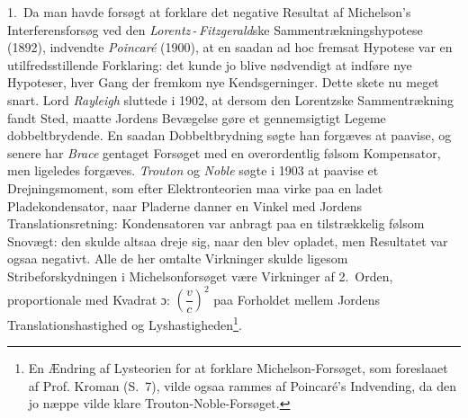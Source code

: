 \documentclass[12pt,a4paper]{article}
\begin{document}
1.\ Da man havde forsøgt at forklare det negative Resultat af
Michelson's Interferensforsøg ved den \emph{Lorentz\,-\,Fitzgerald}ske
Sammentrækningshypotese (1892), indvendte \emph{Poincaré} (1900),
at en saadan ad hoc fremsat Hypotese var en utilfredsstillende
Forklaring: det kunde jo blive nødvendigt at indføre nye Hypoteser,
hver Gang der fremkom nye Kendsgerninger. Dette skete nu meget snart.
Lord \emph{Rayleigh} sluttede i 1902, at dersom den Lorentzske
Sammentrækning fandt Sted, maatte Jordens Bevægelse gøre et
gennemsigtigt Legeme dobbeltbrydende. En saadan Dobbeltbrydning søgte
han forgæves at paavise, og senere har \emph{Brace} gentaget Forsøget
med en overordentlig følsom Kompensator, men ligeledes forgæves.
\emph{Trouton} og \emph{Noble} søgte i 1903 at paavise et
Drejningsmoment, som efter Elektronteorien maa virke paa en ladet
Pladekondensator, naar Pladerne danner en Vinkel med Jordens
Translationsretning: Kondensatoren var anbragt paa en tilstrækkelig
følsom Snovægt: den skulde altsaa dreje sig, naar den blev opladet, men
Resultatet var ogsaa negativt. Alle de her omtalte Virkninger skulde
ligesom Stribeforskydningen i Michelsonforsøget være Virkninger af
2.~Orden, proportionale med Kvadrat ɔ: $\left(\dfrac{v}{c}\right)^{2}$
paa Forholdet mellem Jordens Translationshastighed og
Lyshastigheden\footnote{En Ændring af Lysteorien for at forklare
Michelson-Forsøget, som foreslaaet af Prof. Kroman (S.~7), vilde ogsaa
rammes af Poincaré's Indvending, da den jo næppe vilde klare
Trouton-Noble-Forsøget.}.
\end{document}
